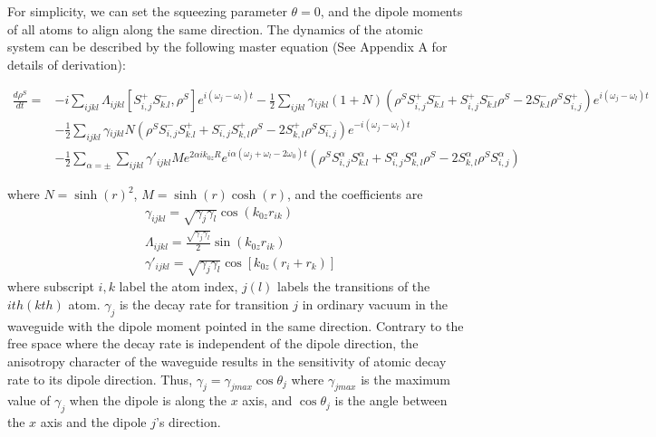 \documentclass[aps,showpacs,twocolumn,twoside,groupedaddress]{revtex4}
\begin{document}
For simplicity, we can set the squeezing parameter $\theta=0$, and the dipole moments of all atoms to align along the same direction. The dynamics of the atomic system can be described by the following master equation (See Appendix A for details of derivation):
\begin{widetext}
\begin{equation}
\label{eq1}
\begin{split}
\frac{d\rho^{S}}{dt}=&-i\underset{ijkl}{\sum}\Lambda_{ijkl}[S_{i,j}^{+}S_{k.l}^{-},\rho^{S}]e^{i(\omega_{j}-\omega_{l})t}-\frac{1}{2}\underset{ijkl}{\sum}\gamma{}_{ijkl}(1+N)(\rho^{S}S_{i,j}^{+}S_{k.l}^{-}+S_{i,j}^{+}S_{k.l}^{-}\rho^{S}-2S_{k.l}^{-}\rho^{S}S_{i,j}^{+})e^{i(\omega_{j}-\omega_{l})t}\\
&-\frac{1}{2}\underset{ijkl}{\sum}\gamma{}_{ijkl}N(\rho^{S}S_{i,j}^{-}S_{k.l}^{+}+S_{i,j}^{-}S_{k,l}^{+}\rho^{S}-2S_{k,l}^{+}\rho^{S}S_{i,j}^{-})e^{-i(\omega_{j}-\omega_{l})t}\\
&-\frac{1}{2}\sum_{\alpha=\pm}\underset{ijkl}{\sum}\gamma'_{ijkl}Me^{2\alpha ik_{0z}R}e^{i\alpha(\omega_{j}+\omega_{l}-2\omega_{0})t}(\rho^{S}S_{i,j}^{\alpha}S_{k.l}^{\alpha}+S_{i,j}^{\alpha}S_{k,l}^{\alpha}\rho^{S}-2S_{k,l}^{\alpha}\rho^{S}S_{i,j}^{\alpha})
\end{split}
\end{equation}
\end{widetext}
where $N=\sinh(r)^2$, $M=\sinh(r)\cosh(r)$, and the coefficients are
\begin{equation}
\label{eq2}
\begin{split}
& \gamma_{ijkl}=\sqrt{\gamma_{j}\gamma_{l}}\cos(k_{0z}r_{ik}) \\
& \Lambda_{ijkl}=\frac{\sqrt{\gamma_{j}\gamma_{l}}}{2}\sin(k_{0z}r_{ik})\\
& \gamma'_{ijkl}=\sqrt{\gamma_{j}\gamma_{l}}\cos[k_{0z}(r_{i}+r_{k})]
\end{split}
\end{equation}
where subscript $i,k$ label the atom index, $j(l)$ labels the transitions of the $ith (kth)$ atom. $\gamma_{j}$ is the decay rate for transition $j$ in ordinary vacuum in the waveguide with the dipole moment pointed in the same direction. Contrary to the free space where the decay rate is independent of the dipole direction, the anisotropy character of the waveguide results in the sensitivity of atomic decay rate to its dipole direction. Thus, $\gamma_j=\gamma_{jmax}\cos\theta_j$ where $\gamma_{jmax}$ is the maximum value of $\gamma_{j}$ when the dipole is along the $x$ axis, and $\cos\theta_j$ is the angle between the $x$ axis and the dipole $j$'s direction. 
\end{document}
